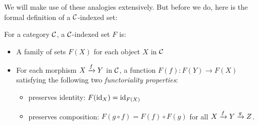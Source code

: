 We will make use of these analogies extensively. But before 
we do, here is the formal definition of a $\mathcal C$-indexed set:

\begin{definition}
  For a category $\mathcal C$,
  a $\mathcal C$-indexed set $F$ is:
  \begin{itemize}
    \item A family of sets
  $F(X)$ for each object $X$ in $\mathcal C$
    \item For each morphism $X \xrightarrow{f} Y$ in $\mathcal C$, 
    a function $F(f) : F(Y) \to F(X)$ satisfying
    the following two \emph{functoriality properties}:
    \begin{itemize}
    \item preserves identity: $F(\operatorname{id}_X) = \operatorname{id}_{F(X)}$
    \item preserves composition: $F(g \circ f) = F(f) \circ F(g)$ for all $X \xrightarrow{f} Y \xrightarrow{g} Z$.
    \end{itemize}
  \end{itemize}
\end{definition}

